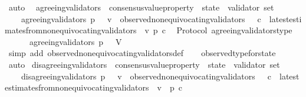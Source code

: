 \begin{isabellebody}
\ auto%
\endisatagproof
{\isafoldproof}%
%
\isadelimproof
\isanewline
%
\endisadelimproof
\isanewline
\isanewline
\isanewline
{}\isamarkupfalse%
\ \ agreeing{\isacharunderscore}validators\ {\isacharcolon}{\isacharcolon}\ {\isachardoublequoteopen}{\isacharparenleft}consensus{\isacharunderscore}value{\isacharunderscore}property\ {\isacharasterisk}\ state{\isacharparenright}\ {\isasymRightarrow}\ validator\ set{\isachardoublequoteclose}\isanewline
\ \ \isanewline
\ \ \ \ {\isachardoublequoteopen}agreeing{\isacharunderscore}validators\ {\isacharparenleft}p{\isacharcomma}\ {\isasymsigma}{\isacharparenright}\ {\isacharequal}\ {\isacharbraceleft}v\ {\isasymin}\ observed{\isacharunderscore}non{\isacharunderscore}equivocating{\isacharunderscore}validators\ {\isasymsigma}{\isachardot}\ {\isasymforall}\ c\ {\isasymin}\ latest{\isacharunderscore}estimates{\isacharunderscore}from{\isacharunderscore}non{\isacharunderscore}equivocating{\isacharunderscore}validators\ {\isasymsigma}\ v{\isachardot}\ p\ c{\isacharbraceright}{\isachardoublequoteclose}\isanewline
\isanewline
{}\isamarkupfalse%
\ {\isacharparenleft}\ Protocol{\isacharparenright}\ agreeing{\isacharunderscore}validators{\isacharunderscore}type\ {\isacharcolon}\isanewline
\ \ {\isachardoublequoteopen}{\isasymforall}\ {\isasymsigma}\ {\isasymin}\ {\isasymSigma}{\isachardot}\ agreeing{\isacharunderscore}validators\ {\isacharparenleft}p{\isacharcomma}\ {\isasymsigma}{\isacharparenright}\ {\isasymsubseteq}\ V{\isachardoublequoteclose}\isanewline
%
\isadelimproof
\ \ %
\endisadelimproof
%
\isatagproof
{}\isamarkupfalse%
\ {\isacharparenleft}simp\ add{\isacharcolon}\ observed{\isacharunderscore}non{\isacharunderscore}equivocating{\isacharunderscore}validators{\isacharunderscore}def{\isacharparenright}\isanewline
\ \ \isamarkupfalse%
\ observed{\isacharunderscore}type{\isacharunderscore}for{\isacharunderscore}state\ \isamarkupfalse%
\ auto%
\endisatagproof
{\isafoldproof}%
%
\isadelimproof
\isanewline
%
\endisadelimproof
\isanewline
\isanewline
{}\isamarkupfalse%
\ disagreeing{\isacharunderscore}validators\ {\isacharcolon}{\isacharcolon}\ {\isachardoublequoteopen}{\isacharparenleft}consensus{\isacharunderscore}value{\isacharunderscore}property\ {\isacharasterisk}\ state{\isacharparenright}\ {\isasymRightarrow}\ validator\ set{\isachardoublequoteclose}\isanewline
\ \ \isanewline
\ \ \ \ {\isachardoublequoteopen}disagreeing{\isacharunderscore}validators\ {\isacharparenleft}p{\isacharcomma}\ {\isasymsigma}{\isacharparenright}\ {\isacharequal}\ {\isacharbraceleft}v\ {\isasymin}\ observed{\isacharunderscore}non{\isacharunderscore}equivocating{\isacharunderscore}validators\ {\isasymsigma}{\isachardot}\ {\isasymexists}\ c\ {\isasymin}\ latest{\isacharunderscore}estimates{\isacharunderscore}from{\isacharunderscore}non{\isacharunderscore}equivocating{\isacharunderscore}validators\ {\isasymsigma}\ v{\isachardot}\ {\isasymnot}\ p\ c{\isacharbraceright}{\isachardoublequoteclose}\isanewline

\end{isabellebody}
